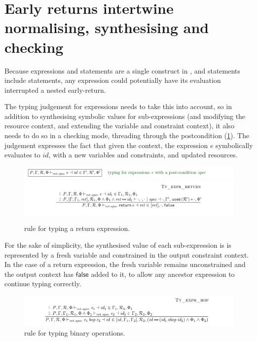 \section{Early returns intertwine normalising, synthesising and checking}

Because expressions and statements are a single construct in , and
statements include  statements, any expression could
potentially have its evaluation interrupted a nested early-return.

The typing judgement for expressions needs to take this into account, so in
addition to synthesising symbolic values for sub-expressions (and modifying the
resource context, and extending the variable and constraint context), it also
needs to do so in a checking mode, threading through the postcondition
(\cref{fig:minicn-return}). The judgement expresses the fact that given the
context, the expression $\mathit{e}$ symbolically evaluates to $\mathit{id}$,
with a new variables and constraints, and updated resources.

\begin{figure}[tpb]
    \ContinuedFloat*
    \includegraphics{figures/minicn-expr-judgement}
    \includegraphics{figures/minicn-return}
    \caption{ rule for typing a return expression.}\label{fig:minicn-return}
\end{figure}

For the sake of simplicity, the synthesised value of each sub-expression is is
represented by a fresh variable and constrained in the output constraint
context. In the case of a return expression, the fresh variable remains
unconstrained and the output context has $\mathsf{false}$ added to it, to allow
any ancestor expression to continue typing correctly.

\begin{figure}[tpb]
    \ContinuedFloat{}
    \includegraphics{figures/minicn-bop}
    \caption{ rule for typing binary operations.}\label{fig:minicn-bop}
\end{figure}

